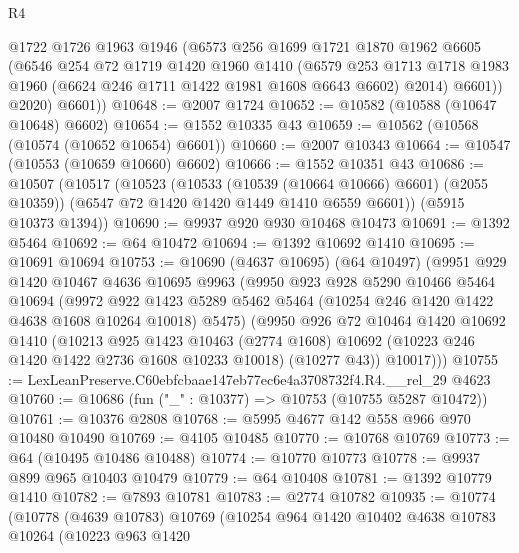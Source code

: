\begin{lexlean}{R4}
\begin{coremodule}
          @1722
          @1726
          @1963
          @1946
          (@6573
            @256
            @1699
            @1721
            @1870
            @1962
            @6605
            (@6546
              @254
              @72
              @1719
              @1420
              @1960
              @1410
              (@6579
                @253
                @1713
                @1718
                @1983
                @1960
                (@6624 @246 @1711 @1422 @1981 @1608 @6643 @6602)
                @2014)
              @6601))
          @2020)
        @6601))
@10648 := @2007 @1724
@10652 := @10582 (@10588 (@10647 @10648) @6602)
@10654 := @1552 @10335 @43
@10659 := @10562 (@10568 (@10574 (@10652 @10654) @6601))
@10660 := @2007 @10343
@10664 := @10547 (@10553 (@10659 @10660) @6602)
@10666 := @1552 @10351 @43
@10686 := @10507
    (@10517
      (@10523
        (@10533 (@10539 (@10664 @10666) @6601) (@2055 @10359))
        (@6547 @72 @1420 @1420 @1449 @1410 @6559 @6601))
      (@5915 @10373 @1394))
@10690 := @9937 @920 @930 @10468 @10473
@10691 := @1392 @5464
@10692 := @64 @10472
@10694 := @1392 @10692 @1410
@10695 := @10691 @10694
@10753 := @10690
    (@4637 @10695)
    (@64 @10497)
    (@9951
      @929
      @1420
      @10467
      @4636
      @10695
      @9963
      (@9950
        @923
        @928
        @5290
        @10466
        @5464
        @10694
        (@9972
          @922
          @1423
          @5289
          @5462
          @5464
          (@10254 @246 @1420 @1422 @4638 @1608 @10264 @10018)
          @5475)
        (@9950
          @926
          @72
          @10464
          @1420
          @10692
          @1410
          (@10213
            @925
            @1423
            @10463
            (@2774 @1608)
            @10692
            (@10223 @246 @1420 @1422 @2736 @1608 @10233 @10018)
            (@10277 @43))
          @10017)))
@10755 := LexLeanPreserve.C60ebfcbaae147eb77ec6e4a3708732f4.R4.__rel_29 @4623
@10760 := @10686 (fun ("_" : @10377) => @10753 (@10755 @5287 @10472))
@10761 := @10376 @2808
@10768 := @5995 @4677 @142 @558 @966 @970 @10480 @10490
@10769 := @4105 @10485
@10770 := @10768 @10769
@10773 := @64 (@10495 @10486 @10488)
@10774 := @10770 @10773
@10778 := @9937 @899 @965 @10403 @10479
@10779 := @64 @10408
@10781 := @1392 @10779 @1410
@10782 := @7893 @10781
@10783 := @2774 @10782
@10935 := @10774
    (@10778
      (@4639 @10783)
      @10769
      (@10254
        @964
        @1420
        @10402
        @4638
        @10783
        @10264
        (@10223
          @963
          @1420

\end{coremodule}
\end{lexlean}
